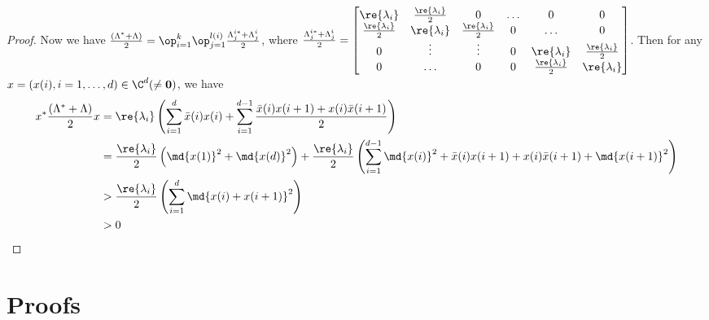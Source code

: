\begin{proof}
Now we have $\frac{(\Lambda^*+\Lambda)}{2}=\op_{i=1}^k \op_{j=1}^{l(i)}\frac{\Lambda^{i*}_{j}+\Lambda^i_{j}}{2}$, where $\frac{\Lambda^{i*}_{j}+\Lambda^i_{j}}{2}=\begin{bmatrix} \re{\lambda_i} &\frac{\re{\lambda_i}}{2} &0 &\ldots &0 &0\\ \frac{\re{\lambda_i}}{2} &\re{\lambda_i} &\frac{\re{\lambda_i}}{2} &0 &\ldots &0 \\ 0 &\vdots &\vdots &0 &\re{\lambda_i} &\frac{\re{\lambda_i}}{2} \\ 0 &\ldots &0 &0 &\frac{\re{\lambda_i}}{2} &\re{\lambda_i} \end{bmatrix} $. Then for any $x=(x(i),i=1,\ldots,d)\in \C^d (\neq \mathbf{0})$, we have %
\begin{align*}
x^* \frac{(\Lambda^*+\Lambda)}{2} x &=\re{\lambda_i} \left(\sum_{i=1}^d \bar{x}{(i)} x(i)+\sum_{i=1}^{d-1} \frac{\bar{x}(i) x(i+1) + x(i)\bar{x}(i+1)}{2}\right) \\
&=\frac{\re{\lambda_i}}{2}\left(\md{x(1)}^2+ \md{x(d)}^2\right)+\frac{\re{\lambda_i}}{2}\left( \sum_{i=1}^{d-1} \md{x(i)}^2+\bar{x}(i) x(i+1) + x(i)\bar{x}(i+1)+\md{x(i+1)}^2 \right)\\
&>\frac{\re{\lambda_i}}{2}\left(\sum_{i=1}^d \md{x(i)+x(i+1)}^2 \right)\\
&> 0
\end{align*}
\end{proof}
\section{Proofs}\label{sec:proofs}
